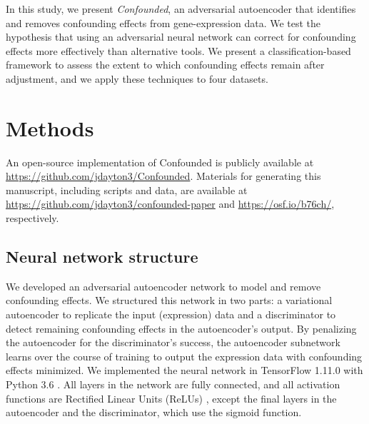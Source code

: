 \documentclass[11pt]{article}
\begin{document}
In this study, we present \textit{Confounded}, an adversarial autoencoder that identifies and removes confounding effects from gene-expression data.
We test the hypothesis that using an adversarial neural network can correct for confounding effects more effectively than alternative tools.
We present a classification-based framework to assess the extent to which confounding effects remain after adjustment, and we apply these techniques to four datasets.

\section{Methods} \label{sec:methods}

An open-source implementation of Confounded is publicly available at \url{https://github.com/jdayton3/Confounded}. Materials for generating this manuscript, including scripts and data, are available at \url{https://github.com/jdayton3/confounded-paper} and \url{https://osf.io/b76ch/}, respectively.

\subsection{Neural network structure}

We developed an adversarial autoencoder network to model and remove confounding effects.
We structured this network in two parts: a variational autoencoder \cite{louizos_variational_2015} to replicate the input (expression) data and a discriminator to detect remaining confounding effects in the autoencoder's output.
By penalizing the autoencoder for the discriminator's success, the autoencoder subnetwork learns over the course of training to output the expression data with confounding effects minimized.
We implemented the neural network in TensorFlow 1.11.0 \cite{abadi_tensorflow_2015} with Python 3.6 \cite{python_software_foundation_python_2019}.
All layers in the network are fully connected, and all activation functions are Rectified Linear Units (ReLUs) \cite{agarap_deep_2018}, except the final layers in the autoencoder and the discriminator, which use the sigmoid function.
\end{document}
